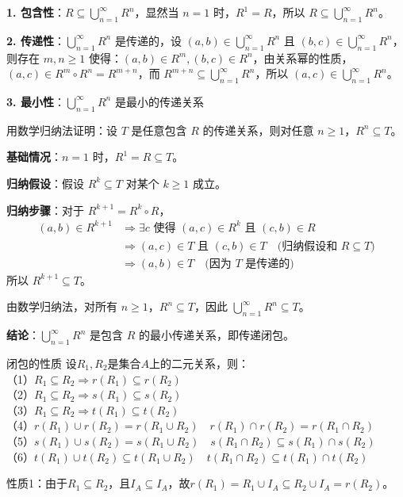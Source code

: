 \documentclass[lang=cn,11pt]{elegantbook}
\begin{document}
\textbf{1. 包含性}：$R \subseteq \bigcup_{n=1}^{\infty} R^n$，显然当 $n=1$ 时，$R^1 = R$，所以 $R \subseteq \bigcup_{n=1}^{\infty} R^n$。

\textbf{2. 传递性}：$\bigcup_{n=1}^{\infty} R^n$ 是传递的，设 $(a,b) \in \bigcup_{n=1}^{\infty} R^n$ 且 $(b,c) \in \bigcup_{n=1}^{\infty} R^n$，则存在 $m,n \geq 1$ 使得：$(a,b) \in R^m ,(b,c) \in R^n$，由关系幂的性质，$(a,c) \in R^m \circ R^n = R^{m+n}$，而 $R^{m+n} \subseteq \bigcup_{n=1}^{\infty} R^n$，所以 $(a,c) \in \bigcup_{n=1}^{\infty} R^n$。

\textbf{3. 最小性}：$\bigcup_{n=1}^{\infty} R^n$ 是最小的传递关系

用数学归纳法证明：设 $T$ 是任意包含 $R$ 的传递关系，则对任意 $n \geq 1$，$R^n \subseteq T$。

\textbf{基础情况}：$n=1$ 时，$R^1 = R \subseteq T$。

\textbf{归纳假设}：假设 $R^k \subseteq T$ 对某个 $k \geq 1$ 成立。

\textbf{归纳步骤}：对于 $R^{k+1} = R^k \circ R$，
\begin{align*}
(a,b) \in R^{k+1} &\Rightarrow \exists c \text{ 使得 } (a,c) \in R^k \text{ 且 } (c,b) \in R \\
&\Rightarrow (a,c) \in T \text{ 且 } (c,b) \in T \quad \text{(归纳假设和 $R \subseteq T$)} \\
&\Rightarrow (a,b) \in T \quad \text{(因为 $T$ 是传递的)}
\end{align*}
所以 $R^{k+1} \subseteq T$。

由数学归纳法，对所有 $n \geq 1$，$R^n \subseteq T$，因此 $\bigcup_{n=1}^{\infty} R^n \subseteq T$。

\textbf{结论}：$\bigcup_{n=1}^{\infty} R^n$ 是包含 $R$ 的最小传递关系，即传递闭包。
\begin{theorem}{闭包的性质}
设$R_1,R_2$是集合$A$上的二元关系，则：\\
（1）$R_1\subseteq R_2\Rightarrow r(R_1)\subseteq r(R_2)$\\
（2）$R_1\subseteq R_2\Rightarrow s(R_1)\subseteq s(R_2)$\\
（3）$R_1\subseteq R_2\Rightarrow t(R_1)\subseteq t(R_2)$\\
（4）$r(R_1)\cup r(R_2)=r(R_1\cup R_2)\quad r(R_1)\cap r(R_2)=r(R_1\cap R_2)$\\
（5）$s(R_1)\cup s(R_2)=s(R_1\cup R_2)\quad s(R_1\cap R_2)\subseteq s(R_1)\cap s(R_2)$\\
（6）$t(R_1)\cup t(R_2)\subseteq t(R_1\cup R_2)\quad t(R_1\cap R_2)\subseteq t(R_1)\cap t(R_2)$
\end{theorem}
性质1：由于$R_1 \subseteq R_2$，且$I_A \subseteq I_A$，故$r(R_1) = R_1 \cup I_A \subseteq R_2 \cup I_A = r(R_2)$。
\end{document}
